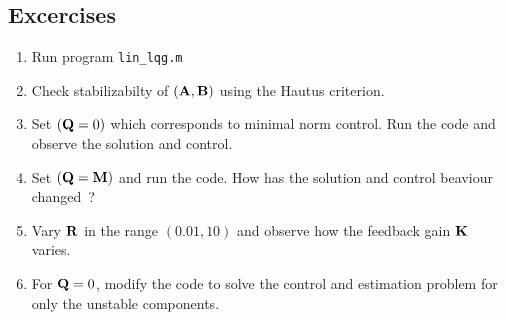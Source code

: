 \documentclass[12pt]{article}
\begin{document}
\subsection{Excercises}

\begin{enumerate}

\item Run program {\tt lin\_lqg.m}

\item Check stabilizabilty of $({\mathbf A},{\mathbf B})$ using the Hautus criterion.

\item Set $({\mathbf Q} = 0)$ which corresponds to minimal norm control. Run the code and observe the solution and control.

\item Set $({\mathbf Q} = {\mathbf M})$ and run the code. How has the solution and control beaviour changed~?

\item Vary ${\mathbf R}$ in the range $(0.01,10)$ and observe how the feedback gain ${\mathbf K}$ varies.

\item For ${\mathbf Q} = 0$, modify the code to solve the control and estimation problem for only the unstable components.
\end{enumerate}


\end{document}
